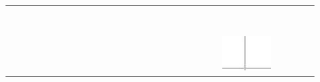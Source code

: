 \documentclass[10pt]{article}
\begin{document}
\begin{center}
\begin{tabular}{|c|c|c|c|c|c|c|c|c|c|c|c|c|c|c|c|c|c|c|c|c|c|c|c|c|c|c|}
\hline
 &  &  &  &  &  &  &  &  &  &  &  &  &  &  &  &  &  &  &  &  &  &  &  &  &  &  \\
\hline
 &  &  &  &  &  &  &  &  &  &  &  &  &  &  &  &  &  &  &  &  &  &  &  &  &  &  \\
\hline
 &  &  &  &  &  &  &  &  &  &  &  &  &  &  &  &  &  &  &  &  &  &  &  &  &  &  \\
\hline
 &  &  &  &  &  &  &  &  &  &  &  &  &  &  &  &  &  &  &  &  &  &  &  &  &  &  \\
\hline
 &  &  &  &  &  &  &  &  &  &  &  &  &  &  &  &  &  &  &  &  &  &  &  &  &  &  \\
\hline
 &  &  &  &  &  &  &  &  &  &  &  &  &  &  &  &  &  &  &  &  &  &  &  &  &  &  \\
\hline
 &  &  &  &  &  &  &  &  &  &  &  &  &  &  &  &  &  &  &  &  &  &  &  &  &  &  \\
\hline
 &  &  &  &  &  &  &  &  &  &  &  &  &  &  &  &  &  &  &  &  &  &  &  &  &  &  \\
\hline
 &  &  &  &  &  &  &  &  &  &  &  &  &  &  &  &  &  &  &  &  &  &  &  &  &  &  \\
\hline
 &  &  &  &  &  &  &  &  &  &  &  &  &  &  &  &  &  &  &  &  &  & \includegraphics[max width=\textwidth]{2024_11_21_7b5527312ea89ae66fd0g-24(4)}

\end{tabular}
\end{center}
\end{document}
